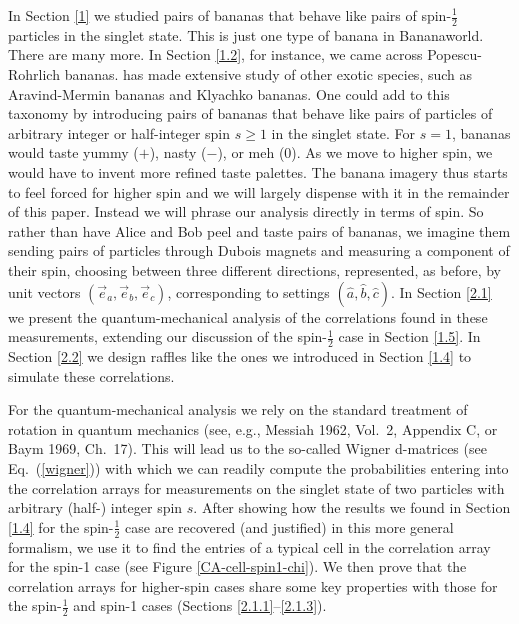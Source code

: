 


In Section \ref{1} we studied pairs of bananas that behave like pairs of spin-$\frac12$ particles in the singlet state. This is just one type of banana in Bananaworld. There are many more. In Section \ref{1.2}, for instance, we came across Popescu-Rohrlich bananas. \citet[Ch.\ 6]{Bub 2016} has made extensive study of other exotic species, such as Aravind-Mermin bananas and Klyachko bananas. One could add to this taxonomy by introducing pairs of bananas that behave like pairs of particles of arbitrary integer or half-integer spin $s \ge 1$ in the singlet state. For $s=1$, bananas would taste yummy ($+$), nasty ($-$), or meh ($0$). As we move to higher spin, we would have to invent more refined taste palettes. The banana imagery thus starts to feel forced for higher spin and we will largely dispense with it in the remainder of this paper. Instead we will phrase our analysis directly in terms of spin. So rather than have Alice and Bob peel and taste pairs of bananas, we imagine them sending pairs of particles through Dubois magnets and measuring a component of their spin, choosing between three different directions, represented, as before, by unit vectors $(\vec{e}_a, \vec{e}_b, \vec{e}_c)$, corresponding to settings $(\hat{a}, \hat{b}, \hat{c})$. In Section \ref{2.1} we present the quantum-mechanical analysis of the correlations found in these measurements, extending our discussion of the spin-$\frac12$ case in Section \ref{1.5}. In Section \ref{2.2} we design raffles like the ones we introduced in Section \ref{1.4} to simulate these correlations. 

For the quantum-mechanical analysis we rely on the standard treatment of rotation in quantum mechanics (see, e.g., Messiah 1962, Vol.\ 2, Appendix C, or Baym 1969, Ch.\ 17). This will lead us to the so-called Wigner d-matrices (see Eq.\ (\ref{wigner})) with which we can readily compute the probabilities entering into the correlation arrays for measurements on the singlet state of two particles with arbitrary (half-) integer spin $s$. After showing how the results we found in Section \ref{1.4} for the spin-$\frac12$ case are recovered (and justified) in this more general formalism, we use it to find the entries of a typical cell in the correlation array for the spin-1 case (see Figure \ref{CA-cell-spin1-chi}). We then prove that the correlation arrays for higher-spin cases share some key properties with those for the spin-$\frac12$ and spin-1 cases (Sections \ref{2.1.1}--\ref{2.1.3}). 

